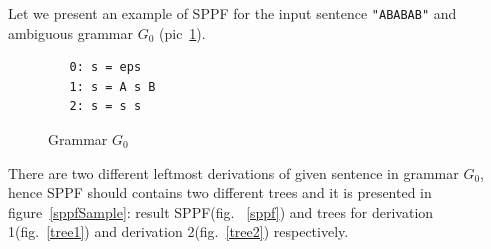 Let we present an example of SPPF for the input sentence \verb|"ABABAB"| and ambiguous grammar $G_0$ (pic~\ref{grammarG0}).

\begin{figure}[h]
   \begin{center}
\begin{verbatim}
   0: s = eps
   1: s = A s B
   2: s = s s
\end{verbatim}
   \caption{Grammar $G_0$}
   \label{grammarG0}        
   \end{center}
\end{figure}


There are two different leftmost derivations of given sentence in grammar $G_0$, hence SPPF should contains two different trees and it is presented in figure~\ref{sppfSample}: result SPPF(fig. ~\ref{sppf}) and trees for derivation 1(fig.~\ref{tree1}) and derivation 2(fig.~\ref{tree2}) respectively. 
 
